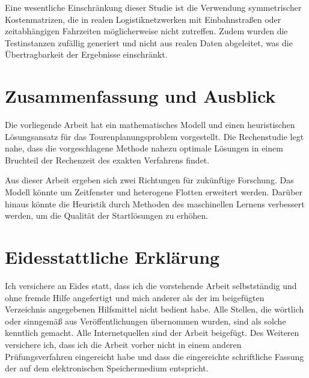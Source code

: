 \documentclass[11pt,a4paper]{article}
\begin{document}
Eine wesentliche Einschränkung dieser Studie ist die Verwendung symmetrischer Kostenmatrizen, die in realen Logistiknetzwerken mit Einbahnstraßen oder zeitabhängigen Fahrzeiten möglicherweise nicht zutreffen. Zudem wurden die Testinstanzen zufällig generiert und nicht aus realen Daten abgeleitet, was die Übertragbarkeit der Ergebnisse einschränkt.

\section{Zusammenfassung und Ausblick}
\label{sec:zusammenfassung}
Die vorliegende Arbeit hat ein mathematisches Modell und einen heuristischen Lösungsansatz für das Tourenplanungsproblem vorgestellt. Die Rechenstudie legt nahe, dass die vorgeschlagene Methode nahezu optimale Lösungen in einem Bruchteil der Rechenzeit des exakten Verfahrens findet.

Aus dieser Arbeit ergeben sich zwei Richtungen für zukünftige Forschung. Das Modell könnte um Zeitfenster und heterogene Flotten erweitert werden. Darüber hinaus könnte die Heuristik durch Methoden des maschinellen Lernens verbessert werden, um die Qualität der Startlösungen zu erhöhen.

\newpage
{}
\setcounter{page}{6} %
\printbibliography

\newpage
{}
\section*{Eidesstattliche Erklärung}
Ich versichere an Eides statt, dass ich die vorstehende Arbeit selbstständig und ohne fremde Hilfe angefertigt und mich anderer als der im beigefügten Verzeichnis angegebenen Hilfsmittel nicht bedient habe. Alle Stellen, die wörtlich oder sinngemäß aus Veröffentlichungen übernommen wurden, sind als solche kenntlich gemacht. Alle Internetquellen sind der Arbeit beigefügt. Des Weiteren versichere ich, dass ich die Arbeit vorher nicht in einem anderen Prüfungsverfahren eingereicht habe und dass die eingereichte schriftliche Fassung der auf dem elektronischen Speichermedium entspricht.
\end{document}
